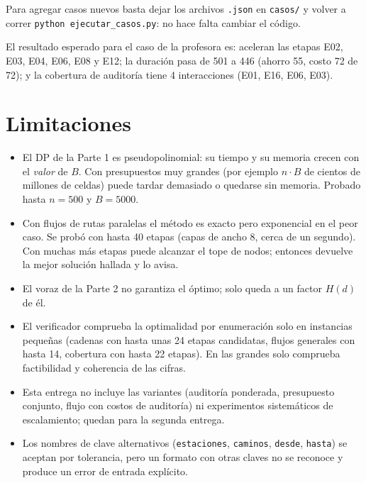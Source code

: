 \documentclass[11pt,a4paper]{article}
\begin{document}
Para agregar casos nuevos basta dejar los archivos \texttt{.json} en \texttt{casos/} y volver a correr \texttt{python ejecutar\_casos.py}: no hace falta cambiar el código.

El resultado esperado para el caso de la profesora es: aceleran las etapas E02, E03, E04, E06, E08 y E12; la duración pasa de 501 a 446 (ahorro 55, costo 72 de 72); y la cobertura de auditoría tiene 4 interacciones (E01, E16, E06, E03).

\section{Limitaciones}

\begin{itemize}[nosep]
  \item El DP de la Parte 1 es pseudopolinomial: su tiempo y su memoria crecen con el \emph{valor} de $B$. Con presupuestos muy grandes (por ejemplo $n\cdot B$ de cientos de millones de celdas) puede tardar demasiado o quedarse sin memoria. Probado hasta $n=500$ y $B=5000$.
  \item Con flujos de rutas paralelas el método es exacto pero exponencial en el peor caso. Se probó con hasta 40 etapas (capas de ancho 8, cerca de un segundo). Con muchas más etapas puede alcanzar el tope de nodos; entonces devuelve la mejor solución hallada y lo avisa.
  \item El voraz de la Parte 2 no garantiza el óptimo; solo queda a un factor $H(d)$ de él.
  \item El verificador comprueba la optimalidad por enumeración solo en instancias pequeñas (cadenas con hasta unas 24 etapas candidatas, flujos generales con hasta 14, cobertura con hasta 22 etapas). En las grandes solo comprueba factibilidad y coherencia de las cifras.
  \item Esta entrega no incluye las variantes (auditoría ponderada, presupuesto conjunto, flujo con costos de auditoría) ni experimentos sistemáticos de escalamiento; quedan para la segunda entrega.
  \item Los nombres de clave alternativos (\texttt{estaciones}, \texttt{caminos}, \texttt{desde}, \texttt{hasta}) se aceptan por tolerancia, pero un formato con otras claves no se reconoce y produce un error de entrada explícito.
\end{itemize}
\end{document}
